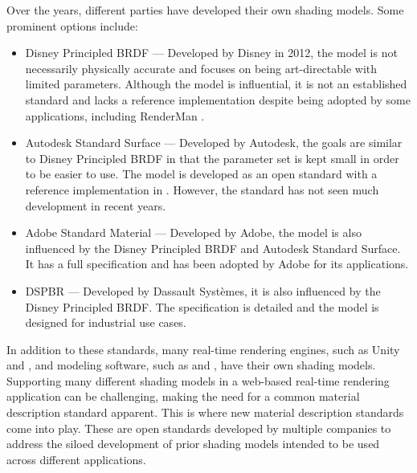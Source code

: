 Over the years, different parties have developed their own shading models. Some prominent options include:

\begin{itemize}
  \item{Disney Principled \gls{BRDF}} \cite{disney2012pbr} — Developed by Disney in 2012, the model is not necessarily physically accurate and focuses on being art-directable with limited parameters. Although the model is influential, it is not an established standard and lacks a reference implementation despite being adopted by some applications, including \gls{RenderMan} \cite{renderManDisneyPbrDocs}.
  \item{Autodesk Standard Surface} \cite{autodeskStandardSurface} — Developed by Autodesk, the goals are similar to Disney Principled \gls{BRDF} in that the parameter set is kept small in order to be easier to use. The model is developed as an open standard with a reference implementation in . However, the standard has not seen much development in recent years.
  \item{Adobe Standard Material} \cite{adobeStandardMaterial} — Developed by Adobe, the model is also influenced by the Disney Principled \gls{BRDF} and Autodesk Standard Surface. It has a full specification and has been adopted by Adobe for its applications.
  \item{\gls{DSPBR}} \cite{dspbrModel} — Developed by Dassault Systèmes, it is also influenced by the Disney Principled \gls{BRDF}. The specification is detailed and the model is designed for industrial use cases.
\end{itemize}

In addition to these standards, many real-time rendering engines, such as \gls{Unity} and , and modeling software, such as  and , have their own shading models. Supporting many different shading models in a web-based real-time rendering application can be challenging, making the need for a common material description standard apparent. This is where new material description standards come into play. These are open standards developed by multiple companies to address the siloed development of prior shading models intended to be used across different applications.

